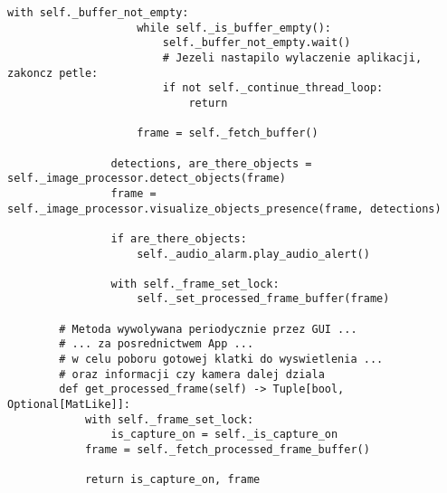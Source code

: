 \begin{lstlisting}[caption={Kod modułu silnika przetwarzania wideo z zawartymi mechanizami synchronizacji}, label={lst:engine-1}]
                with self._buffer_not_empty:
                    while self._is_buffer_empty():
                        self._buffer_not_empty.wait()
                        # Jezeli nastapilo wylaczenie aplikacji, zakoncz petle:
                        if not self._continue_thread_loop:  
                            return
    
                    frame = self._fetch_buffer() 
    
                detections, are_there_objects = self._image_processor.detect_objects(frame)
                frame = self._image_processor.visualize_objects_presence(frame, detections)
    
                if are_there_objects:
                    self._audio_alarm.play_audio_alert()
           
                with self._frame_set_lock:
                    self._set_processed_frame_buffer(frame)
    
        # Metoda wywolywana periodycznie przez GUI ... 
        # ... za posrednictwem App ... 
        # w celu poboru gotowej klatki do wyswietlenia ... 
        # oraz informacji czy kamera dalej dziala
        def get_processed_frame(self) -> Tuple[bool, Optional[MatLike]]:
            with self._frame_set_lock:
                is_capture_on = self._is_capture_on
            frame = self._fetch_processed_frame_buffer()
            
            return is_capture_on, frame
    \end{lstlisting}